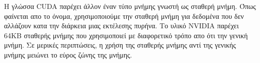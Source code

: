 Η γλώσσα CUDA παρέχει άλλον έναν τύπο μνήμης γνωστή ως σταθερή μνήμη. Όπως φαίνεται απο το όνομα, χρησιμοποιούμε την σταθερή μνήμη για δεδομένα που δεν αλλάζουν κατα την διάρκεια μιας εκτέλεσης πυρήνα. Το υλικό NVIDIA παρέχει 64KB σταθερής μνήμης που χρησιμοποιεί με διαφορετικό τρόπο απο ότι την γενική μνήμη. Σε μερικές περιπτώσεις, η χρήση της σταθερής μνήμης αντί της γενικής μνήμης μειώνει το εύρος ζώνης της μνήμης. 